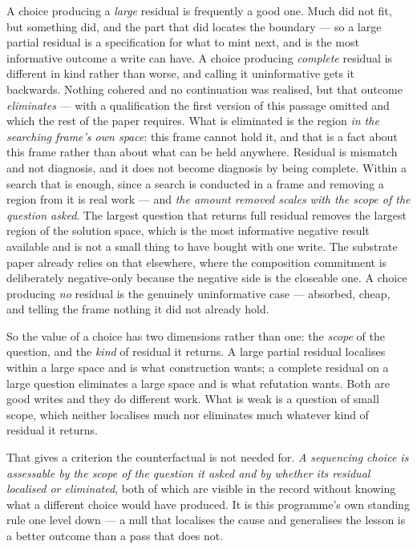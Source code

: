 \documentclass[11pt,a4paper]{article}
\theoremstyle{remark}\newtheorem{remark}[definition]{Remark}
\begin{document}
A choice producing a \emph{large} residual is frequently a good one. Much did not fit, but something
did, and the part that did locates the boundary --- so a large partial residual is a specification for
what to mint next, and is the most informative outcome a write can have. A choice producing \emph{complete} residual
is different in kind rather than worse, and calling it uninformative gets it backwards. Nothing cohered and no continuation was realised, but that outcome
\emph{eliminates} --- with a qualification the first version of this passage omitted and which the rest
of the paper requires. What is eliminated is the region \emph{in the searching frame's own space}:
this frame cannot hold it, and that is a fact about this frame rather than about what can be held
anywhere. Residual is mismatch and not diagnosis, and it does not become diagnosis by being complete.
Within a search that is enough, since a search is conducted in a frame and removing a region from it is
real work --- and \emph{the amount removed scales with the scope of the question asked}. The largest question that returns full residual
removes the largest region of the solution space, which is the most informative negative result
available and is not a small thing to have bought with one write. The substrate paper already relies on that
elsewhere, where the composition commitment is deliberately negative-only because the negative side is
the closeable one. A choice producing \emph{no} residual is the genuinely uninformative case --- absorbed,
cheap, and telling the frame nothing it did not already hold.

So the value of a choice has two dimensions rather than one: the \emph{scope} of the question, and the
\emph{kind} of residual it returns. A large partial residual localises within a large space and is what
construction wants; a complete residual on a large question eliminates a large space and is what
refutation wants. Both are good writes and they do different work. What is weak is a question of small
scope, which neither localises much nor eliminates much whatever kind of residual it returns.

That gives a criterion the counterfactual is not needed for. \emph{A sequencing choice is assessable by
the scope of the question it asked and by whether its residual localised or eliminated}, both of which
are visible in the record without knowing what a different choice would have produced. It is this programme's own standing rule one level down --- a null
that localises the cause and generalises the lesson is a better outcome than a pass that does not.
\end{document}
